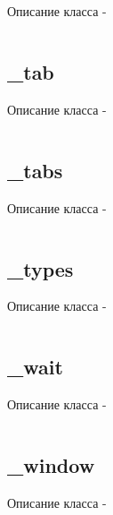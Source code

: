 \documentclass[a4paper, 14pt]{extarticle}
\begin{document}
Описание класса  -
\begin{lstlisting}[numbers=none]

\end{lstlisting}

\subsection{{\color{orange} \_tab}}

Описание класса  -
\begin{lstlisting}[numbers=none]

\end{lstlisting}

\subsection{{\color{orange} \_tabs}}

Описание класса  -
\begin{lstlisting}[numbers=none]

\end{lstlisting}

\subsection{{\color{orange} \_types}}

Описание класса  -
\begin{lstlisting}[numbers=none]

\end{lstlisting}

\subsection{{\color{orange} \_wait}}

Описание класса  -
\begin{lstlisting}[numbers=none]

\end{lstlisting}

\subsection{{\color{orange} \_window}}

Описание класса  -
\begin{lstlisting}[numbers=none]

\end{lstlisting}
\end{document}
